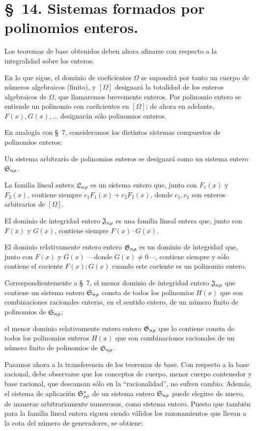\documentclass[11pt]{article}
\begin{document}
\section*{\S\ 14. Sistemas formados por polinomios enteros.}

Los teoremas de base obtenidos deben ahora afinarse con respecto a la integralidad sobre los enteros.

En lo que sigue, el dominio de coeficientes $\Omega$ se supondrá por tanto un cuerpo de números algebraicos (finito), y $[\Omega]$ designará la totalidad de los enteros algebraicos de $\Omega$, que llamaremos brevemente enteros. Por polinomio entero se entiende un polinomio con coeficientes en $[\Omega]$; de ahora en adelante, $F(x),G(x),\ldots$ designarán sólo polinomios enteros.

En analogía con \S\ 7, consideramos los distintos sistemas compuestos de polinomios enteros:

Un sistema arbitrario de polinomios enteros se designará como un sistema entero $\mathfrak{S}_{n\rho}$.

La familia lineal entera $\mathfrak{L}_{n\rho}$ es un sistema entero que, junto con $F_1(x)$ y $F_2(x)$, contiene siempre $c_1F_1(x)+c_2F_2(x)$, donde $c_1,c_2$ son enteros arbitrarios de $[\Omega]$.

El dominio de integridad entero $\mathfrak{J}_{n\rho}$ es una familia lineal entera que, junto con $F(x)$ y $G(x)$, contiene siempre $F(x)\cdot G(x)$.

El dominio relativamente entero entero $\mathfrak{G}_{n\rho}$ es un dominio de integridad que, junto con $F(x)$ y $G(x)$ ---donde $G(x)\ne0$---, contiene siempre y sólo contiene el cociente $F(x):G(x)$ cuando este cociente es un polinomio entero.

Correspondientemente a \S\ 7, el menor dominio de integridad entero $\mathfrak{J}_{n\rho}$ que contiene un sistema entero $\mathfrak{S}_{n\rho}$ consta de todos los polinomios $H(x)$ que son combinaciones racionales enteras, en el sentido entero, de un número finito de polinomios de $\mathfrak{S}_{n\rho}$;

el menor dominio relativamente entero entero $\mathfrak{G}_{n\rho}$ que lo contiene consta de todos los polinomios enteros $H(x)$ que son combinaciones racionales de un número finito de polinomios de $\mathfrak{S}_{n\rho}$.

Pasamos ahora a la transferencia de los teoremas de base. Con respecto a la base racional, debe observarse que los conceptos de cuerpo, menor cuerpo contenedor y base racional, que descansan sólo en la ``racionalidad'', no sufren cambio. Además, el sistema de aplicación $\mathfrak{S}^*_{\rho\rho}$ de un sistema entero $\mathfrak{S}_{n\rho}$ puede elegirse de nuevo, de maneras arbitrariamente numerosas, como sistema entero. Puesto que también para la familia lineal entera siguen siendo válidos los razonamientos que llevan a la cota del número de generadores, se obtiene:
\end{document}
